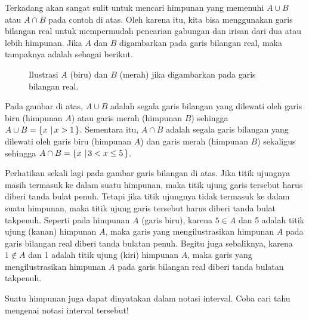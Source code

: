 \par Terkadang akan sangat sulit untuk mencari himpunan yang memenuhi $ A \cup B $ atau $ A \cap B $ pada contoh di atas. Oleh karena itu, kita bisa menggunakan garis bilangan real untuk mempermudah pencarian gabungan dan irisan dari dua atau lebih himpunan. Jika $ A $ dan $ B $ digambarkan pada garis bilangan real, maka tampaknya adalah sebagai berikut.
\begin{figure}[H]
	\centering
	\caption{Ilustrasi $ A $ (biru) dan $ B $ (merah) jika digambarkan pada garis bilangan real.}
\end{figure}
Pada gambar di atas, $ A \cup B $ adalah segala garis bilangan yang dilewati oleh garis biru (himpunan $ A $) atau garis merah (himpunan $ B $) sehingga $ A \cup B = \mathop{}\!\left\lbrace{{x} \, \left|\, {x > 1}\right.}\right\rbrace $. Sementara itu, $ A \cap B $ adalah segala garis bilangan yang dilewati oleh garis biru (himpunan $ A $) dan garis merah (himpunan $ B $) sekaligus sehingga $ A \cap B = \mathop{}\!\left\lbrace{{x} \, \left|\, {3 < x \leq 5}\right.}\right\rbrace $.

\par Perhatikan sekali lagi pada gambar garis bilangan di atas. Jika titik ujungnya masih termasuk ke dalam suatu himpunan, maka titik ujung garis tersebut harus diberi tanda bulat penuh. Tetapi jika titik ujungnya tidak termasuk ke dalam suatu himpunan, maka titik ujung garis tersebut harus diberi tanda bulat takpenuh. Seperti pada himpunan $ A $ (garis biru), karena $ 5 \in A $ dan 5 adalah titik ujung (kanan) himpunan $ A $, maka garis yang mengilustrasikan himpunan $ A $ pada garis bilangan real diberi tanda bulatan penuh. Begitu juga sebaliknya, karena $ 1 \notin A $ dan 1 adalah titik ujung (kiri) himpunan $ A $, maka garis yang mengilustrasikan himpunan $ A $ pada garis bilangan real diberi tanda bulatan takpenuh.

\begin{explbox}
	Suatu himpunan juga dapat dinyatakan dalam notasi interval. Coba cari tahu mengenai notasi interval tersebut!
\end{explbox}

